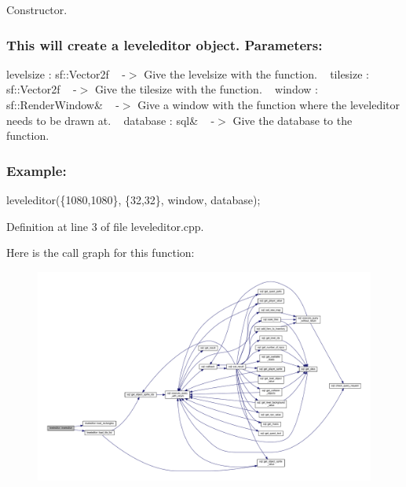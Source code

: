Constructor. 

\subsubsection*{This will create a leveleditor object.  Parameters\+: }

levelsize \+: sf\+::\+Vector2f ~\newline
-\/$>$ Give the levelsize with the function. ~\newline
 tilesize \+: sf\+::\+Vector2f ~\newline
-\/$>$ Give the tilesize with the function. ~\newline
 window \+: sf\+::\+Render\+Window\& ~\newline
-\/$>$ Give a window with the function where the leveleditor needs to be drawn at. ~\newline
 database \+: sql\& ~\newline
-\/$>$ Give the database to the function.~\newline
 \subsubsection*{Example\+: }

leveleditor(\{1080,1080\}, \{32,32\}, window, database); ~\newline


Definition at line 3 of file leveleditor.\+cpp.

Here is the call graph for this function\+:
\nopagebreak
\begin{figure}[H]
\begin{center}
\leavevmode
\includegraphics[width=350pt]{classleveleditor_a5dfc809a9bac07ffa88ce921c077f017_cgraph}
\end{center}
\end{figure}


